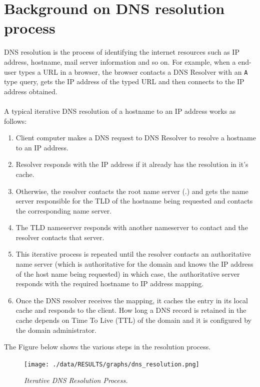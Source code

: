 \documentclass[11pt,a4paper]{article}
\newcommand{\resitem}[1]{\item #1 \vspace{-7pt}}
\begin{document}
\section {Background on DNS resolution process}
DNS resolution is the process of identifying the internet resources such as IP address, hostname, mail server information and so on. For example, when a end-user types a URL in a browser, the browser contacts a DNS Resolver with an \texttt{A} type query, gets the IP address of the typed URL and then connects to the IP address obtained.
\\\\  
A typical iterative DNS resolution of a hostname to an IP address works as follows:
\begin{enumerate}
    \resitem {Client computer makes a DNS request to DNS Resolver to resolve a hostname to an IP address.}
    \resitem {Resolver responds with the IP address if it already has the resolution in it's cache.}
    \resitem {Otherwise, the resolver contacts the root name server (.) and gets the name server responsible for the TLD of the hostname being requested and contacts the corresponding name server.}
    \resitem {The TLD nameserver responds with another nameserver to contact and the resolver contacts that server.}
    \resitem {This iterative process is repeated until the resolver contacts an authoritative name server (which is authoritative for the domain and knows the IP address of the host name being requested) in which case, the authoritative server responds with the required hostname to IP address mapping.}
    \resitem {Once the DNS resolver receives the mapping, it caches the entry in its local cache and responds to the client. How long a DNS record is retained in the cache depends on Time To Live (TTL) of the domain and it is configured by the domain administrator.}
\end{enumerate}

The Figure below shows the various steps in the resolution process.
\begin{figure}[H] 
\centering
\texttt{[image: ./data/RESULTS/graphs/dns\_resolution.png]}
\caption {\textit{Iterative DNS Resolution Process.}}
\label{dns}
\end{figure}
\end{document}
